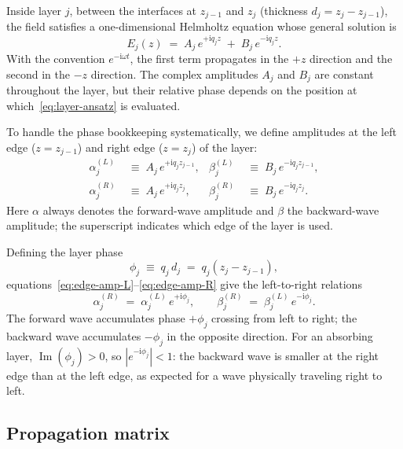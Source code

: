 \documentclass[aps,prb,onecolumn,superscriptaddress,nofootinbib,11pt]{revtex4-2}
\newcommand{\ii}{\mathrm{i}}
\DeclareMathOperator{\Imy}{Im}
\begin{document}
Inside layer $j$, between the interfaces at $z_{j-1}$ and $z_j$ (thickness $d_j = z_j - z_{j-1}$), the field satisfies a one-dimensional Helmholtz equation whose general solution is
\begin{equation}
  E_j(z) \;=\; A_j\, e^{+\ii q_j z} \;+\; B_j\, e^{-\ii q_j z}.
  \label{eq:layer-ansatz}
\end{equation}
With the convention $e^{-\ii\omega t}$, the first term propagates in the $+z$ direction and the second in the $-z$ direction. The complex amplitudes $A_j$ and $B_j$ are constant throughout the layer, but their relative phase depends on the position at which~\eqref{eq:layer-ansatz} is evaluated.

To handle the phase bookkeeping systematically, we define amplitudes at the left edge ($z = z_{j-1}$) and right edge ($z = z_j$) of the layer:
\begin{align}
  \alpha_j^{(L)} &\;\equiv\; A_j\, e^{+\ii q_j z_{j-1}},
  &
  \beta_j^{(L)}  &\;\equiv\; B_j\, e^{-\ii q_j z_{j-1}},
  \label{eq:edge-amp-L}\\[2pt]
  \alpha_j^{(R)} &\;\equiv\; A_j\, e^{+\ii q_j z_j},
  &
  \beta_j^{(R)}  &\;\equiv\; B_j\, e^{-\ii q_j z_j}.
  \label{eq:edge-amp-R}
\end{align}
Here $\alpha$ always denotes the forward-wave amplitude and $\beta$ the backward-wave amplitude; the superscript indicates which edge of the layer is used.

Defining the layer phase
\begin{equation}
  \phi_j \;\equiv\; q_j\, d_j \;=\; q_j (z_j - z_{j-1}),
  \label{eq:phi-def}
\end{equation}
equations~\eqref{eq:edge-amp-L}--\eqref{eq:edge-amp-R} give the left-to-right relations
\begin{equation}
  \alpha_j^{(R)} \;=\; \alpha_j^{(L)}\, e^{+\ii \phi_j},
  \qquad
  \beta_j^{(R)}  \;=\; \beta_j^{(L)}\, e^{-\ii \phi_j}.
  \label{eq:prop-LR}
\end{equation}
The forward wave accumulates phase $+\phi_j$ crossing from left to right; the backward wave accumulates $-\phi_j$ in the opposite direction. For an absorbing layer, $\Imy(\phi_j) > 0$, so $|e^{-\ii\phi_j}| < 1$: the backward wave is smaller at the right edge than at the left edge, as expected for a wave physically traveling right to left.

\subsection{Propagation matrix}
\label{sec:propagation-matrix}
\end{document}
